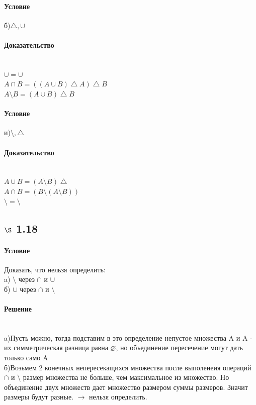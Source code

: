 \documentclass[a4paper,12pt]{article}
\begin{document}
\paragraph*{Условие}
б)$\bigtriangleup, \cup$
\paragraph*{Доказательство} \mbox{}\\
$\cup = \cup $\\
$ A \cap B = ((A \cup B) \bigtriangleup A) \bigtriangleup B $\\
$ A \setminus B =  (A \cup B) \bigtriangleup B$
\paragraph*{Условие}
и)$\setminus, \bigtriangleup$
\paragraph*{Доказательство} \mbox{}\\
$ A \cup B = (A \setminus B) \bigtriangleup $\\
$ A \cap B = (B \setminus (A \setminus B)) $\\
$ \setminus =  \setminus$

\subsection*{$\S$ 1.18}
\paragraph*{Условие}
Доказать, что нельзя определить:\\
a) $\setminus$ через $\cap$ и $\cup $\\
б) $\cup$ через $\cap$ и $\setminus $
\paragraph*{Решение} \mbox{}\\
a)Пусть можно, тогда подставим в это определение непустое множества A и A - их симметрическая разница равна $\varnothing$, но объединение пересечение могут дать только само A\\
б)Возьмем 2 конечных непересекащихся множества после выполенеия операций $\cap$ и $\setminus $ размер множества не больше, чем максимальное из множество. Но объединение двух множеств дает множество размером суммы размеров. Значит размеры будут разные. $\rightarrow$ нельзя определить.
\end{document}
